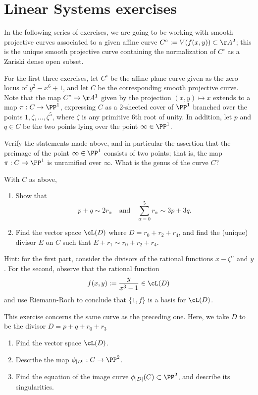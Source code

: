 

\chapter{Linear Systems exercises}\label{linear systems exercises}

In the following series of exercises, we are going to be working with smooth projective curves associated to a given affine curve $C^\circ := V(f(x,y)) \subset \AA^2$; this is the unique smooth projective curve containing the normalization of $C^\circ$ as a Zariski dense open subset.

For the first three exercises, let $C^\circ$ be the affine plane curve given as the zero locus of $y^2 - x^6 +1$, and let $C$ be the corresponding smooth projective curve. Note that the map $C^\circ \to \AA^1$ given by the projection $(x,y) \mapsto x$ extends to a map $\pi : C \to \PP^1$, expressing $C$ as a 2-sheeted cover of $\PP^1$ branched over the points $1, \zeta, \dots, \zeta^5$, where $\zeta$ is any primitive 6th root of unity. In addition, let $p$ and $q \in C$ be the two points lying over the point $\infty \in \PP^1$.

\begin{exercise}
Verify the statements made above, and in particular the assertion that the preimage of the point $\infty \in \PP^1$ consists of two points; that is, the map $\pi : C \to \PP^1$ is unramified over $\infty$. What is the genus of the curve $C$?
\end{exercise}

\begin{exercise} With $C$ as above,
\begin{enumerate}
\item Show that
$$
p+q \sim 2r_\alpha \quad \text{and} \quad \sum_{\alpha = 0}^5 r_\alpha \sim 3p+3q.
$$
\item Find the vector space $\cL(D)$ where $D = r_0 + r_2 + r_4$, and find the (unique) divisor $E$ on $C$ such that $E + r_1 \sim r_0 + r_2 + r_4$.
\end{enumerate}
\end{exercise}

Hint: for the first part, consider the divisors of the rational functions $x-\zeta^\alpha$ and $y$. For the second, observe that the rational function 
$$
f(x,y) := \frac{y}{x^3-1} \in \cL(D)
$$
 and use Riemann-Roch to conclude that $\{1,f\}$ is a basis for $\cL(D)$.

\begin{exercise}
This exercise concerns the same curve as the preceding one. Here, we take $D$ to be the divisor $D = p + q + r_0 + r_3$
\begin{enumerate}
\item Find the vector space $\cL(D)$.
\item Describe the map $\phi_{|D|} : C \to \PP^2$.
\item Find the equation of the image curve $\phi_{|D|}(C) \subset \PP^2$, and describe its singularities.
\end{enumerate}
\end{exercise}


